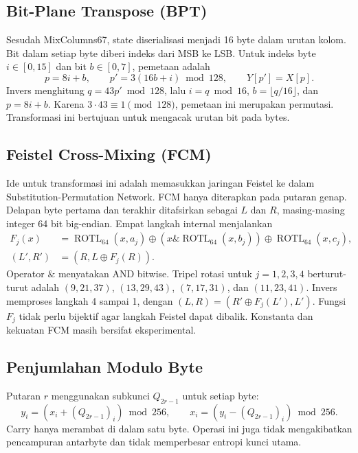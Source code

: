 \subsection{Bit-Plane Transpose (BPT)}
Sesudah MixColumns67, state diserialisasi menjadi 16 byte dalam urutan
kolom. Bit dalam setiap byte diberi indeks dari MSB ke LSB. Untuk indeks
byte $i\in[0,15]$ dan bit $b\in[0,7]$, pemetaan adalah
\begin{equation}
  p=8i+b,\qquad p'=3(16b+i)\bmod128,\qquad Y[p']=X[p].
\end{equation}
Invers menghitung $q=43p'\bmod128$, lalu $i=q\bmod16$,
$b=\lfloor q/16\rfloor$, dan $p=8i+b$. Karena $3\cdot43\equiv1\pmod{128}$,
pemetaan ini merupakan permutasi. Transformasi ini bertujuan untuk mengacak urutan bit pada bytes.

\subsection{Feistel Cross-Mixing (FCM)}
Ide untuk transformasi ini adalah memasukkan jaringan Feistel ke dalam Substitution-Permutation Network. FCM hanya diterapkan pada putaran genap. Delapan byte pertama dan terakhir ditafsirkan sebagai $L$ dan $R$, masing-masing integer 64 bit big-endian. Empat langkah internal menjalankan
\begin{align}
  F_j(x)&=\operatorname{ROTL}_{64}(x,a_j)
    \oplus(x\mathbin{\&}\operatorname{ROTL}_{64}(x,b_j))
    \oplus\operatorname{ROTL}_{64}(x,c_j),\\
  (L',R')&=(R,L\oplus F_j(R)).
\end{align}
Operator $\mathbin{\&}$ menyatakan AND bitwise. Tripel rotasi untuk $j=1,2,3,4$ berturut-turut adalah $(9,21,37)$, $(13,29,43)$,
$(7,17,31)$, dan $(11,23,41)$. Invers memproses langkah 4 sampai 1, dengan $(L,R)=(R'\oplus F_j(L'),L')$. Fungsi $F_j$ tidak perlu bijektif agar langkah Feistel dapat dibalik. Konstanta dan kekuatan FCM masih bersifat eksperimental.

\subsection{Penjumlahan Modulo Byte}
Putaran $r$ menggunakan subkunci $Q_{2r-1}$ untuk setiap byte:
\begin{equation}
  y_i=(x_i+(Q_{2r-1})_i)\bmod256,\qquad
  x_i=(y_i-(Q_{2r-1})_i)\bmod256.
\end{equation}
Carry hanya merambat di dalam satu byte. Operasi ini juga tidak mengakibatkan pencampuran antarbyte dan tidak memperbesar entropi kunci utama.

